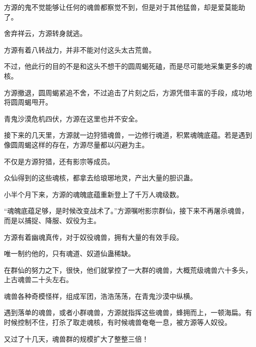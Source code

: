 \begin{this_body}
方源的鬼不觉能够让任何的魂兽都察觉不到，但是对于其他猛兽，却是爱莫能助了。

舍弃祥云，方源转身就逃。

方源有着八转战力，并非不能对付这头太古荒兽。

不过，他此行的目的不是和这头不想干的圆周蝎死磕，而是尽可能地采集更多的魂核。

方源撤退，圆周蝎紧追不舍，不过追击了片刻之后，方源凭借丰富的手段，成功地将圆周蝎甩开。

青鬼沙漠危机四伏，方源在这里也并不安全。

接下来的几天里，方源就一边狩猎魂兽，一边修行魂道，积累魂魄底蕴。若是遇到像圆周蝎这样的存在，方源尽量都以闪避为主。

不仅是方源狩猎，还有影宗等成员。

众仙得到的这些魂核，都拿去给琅琊地灵，产出大量的胆识蛊。

小半个月下来，方源的魂魄底蕴重新登上了千万人魂级数。

“魂魄底蕴足够，是时候改变战术了。”方源嘱咐影宗群仙，接下来不再屠杀魂兽，而是以捕捉、降服、奴役为主。

方源有着幽魂真传，对于奴役魂兽，拥有大量的有效手段。

唯一制约他的，只有魂道、奴道仙蛊稀缺。

在群仙的努力之下，很快，他们就掌控了一大群的魂兽，大概荒级魂兽六十多头，上古魂兽二十头左右。

魂兽各种奇模怪样，组成军团，浩浩荡荡，在青鬼沙漠中纵横。

遇到落单的魂兽，或者小群魂兽，方源就指挥这些魂兽，蜂拥而上，一顿海扁。有时候控制不住，打杀了取走魂核，有时候魂兽奄奄一息，被方源等人奴役。

又过了十几天，魂兽群的规模扩大了整整三倍！

\end{this_body}

